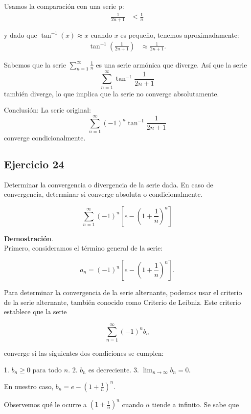 \documentclass{article}
\begin{document}
    Usamos la comparación con una serie p:
    \begin{align*}
    \frac{1}{2n+1} &< \frac{1}{n}
    \end{align*}

    y dado que \( \tan^{-1}(x) \approx x \) cuando \( x \) es pequeño, tenemos aproximadamente:
    \begin{align*}
    \tan^{-1} \left(\frac{1}{2n+1}\right) &\approx \frac{1}{2n+1}.
    \end{align*}

    Sabemos que la serie \( \sum_{n=1}^{\infty} \frac{1}{n} \) es una serie armónica que diverge. Así que la serie
    $$
    \sum_{n=1}^{\infty} \tan^{-1} \frac{1}{2n+1}
    $$
    también diverge, lo que implica que la serie no converge absolutamente.

    Conclusión: La serie original:
    $$
    \sum_{n=1}^{\infty}(-1)^{n} \tan^{-1} \frac{1}{2n+1}
    $$
    converge condicionalmente.

    \subsection*{Ejercicio 24}

    Determinar la convergencia o divergencia de la serie dada. En caso de convergencia, determinar si converge absoluta o condicionalmente.

    $$
    \sum_{n=1}^{\infty}(-1)^{n}\left[e-\left(1+\frac{1}{n}\right)^{n}\right]
    $$

    \textbf{Demostración}.\\

    Primero, consideramos el término general de la serie:

    $$a_n = (-1)^n \left[e - \left(1 + \frac{1}{n}\right)^n \right].$$

    Para determinar la convergencia de la serie alternante, podemos usar el criterio de la serie alternante, también conocido como Criterio de Leibniz. Este criterio establece que la serie

    $$\sum_{n=1}^{\infty} (-1)^n b_n$$

    converge si las siguientes dos condiciones se cumplen:

    1. \(b_n \geq 0\) para todo \(n\).
    2. \(b_n\) es decreciente.
    3. \(\lim_{n \to \infty} b_n = 0\).

    En nuestro caso, \(b_n = e - \left(1 + \frac{1}{n}\right)^n\).

    Observemos qué le ocurre a \( \left(1 + \frac{1}{n}\right)^n \) cuando \(n\) tiende a infinito. Se sabe que
\end{document}
